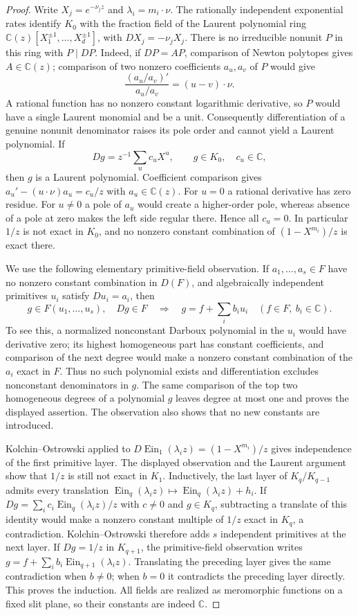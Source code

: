 \documentclass[11pt]{article}
\theoremstyle{definition}
\theoremstyle{remark}
\newcommand{\Ein}{\operatorname{Ein}}
\begin{document}
\begin{proof}
Write $X_j=e^{-\nu_jz}$ and $\lambda_i=m_i\cdot\nu$.
The rationally independent exponential rates identify $K_0$ with the
fraction field of the Laurent polynomial ring
$\mathbb C(z)[X_1^{\pm1},\ldots,X_d^{\pm1}]$,
with $DX_j=-\nu_jX_j$.
There is no irreducible nonunit $P$ in this ring with $P\mid DP$.
Indeed, if $DP=AP$, comparison of Newton polytopes gives
$A\in\mathbb C(z)$; comparison of two nonzero coefficients $a_u,a_v$
of $P$ would give
\[
 \frac{(a_u/a_v)'}{a_u/a_v}=(u-v)\cdot\nu.
\]
A rational function has no nonzero constant logarithmic derivative,
so $P$ would have a single Laurent monomial and be a unit.
Consequently differentiation of a genuine nonunit denominator raises
its pole order and cannot yield a Laurent polynomial. If
\[
 Dg=z^{-1}\sum_u c_uX^u,\qquad g\in K_0,\quad c_u\in\mathbb C,
\]
then $g$ is a Laurent polynomial. Coefficient comparison gives
$a_u'-(u\cdot\nu)a_u=c_u/z$ with $a_u\in\mathbb C(z)$.
For $u=0$ a rational derivative has zero residue. For $u\ne0$ a
pole of $a_u$ would create a higher-order pole, whereas absence of a
pole at zero makes the left side regular there. Hence all $c_u=0$.
In particular $1/z$ is not exact in $K_0$, and no nonzero constant
combination of $(1-X^{m_i})/z$ is exact there.

We use the following elementary primitive-field observation. If
$a_1,\ldots,a_s\in F$ have no nonzero constant combination in $D(F)$,
and algebraically independent primitives $u_i$ satisfy $Du_i=a_i$,
then
\[
 g\in F(u_1,\ldots,u_s),\quad Dg\in F
 \quad\Longrightarrow\quad
 g=f+\sum_i b_i u_i\quad(f\in F,\ b_i\in\mathbb C).
\]
To see this, a normalized nonconstant Darboux polynomial in the $u_i$
would have derivative zero; its highest homogeneous part has constant
coefficients, and comparison of the next degree would make a nonzero
constant combination of the $a_i$ exact in $F$. Thus no such polynomial
exists and differentiation excludes nonconstant denominators in $g$.
The same comparison of the top two homogeneous degrees of a polynomial
$g$ leaves degree at most one and proves the displayed assertion.
The observation also shows that no new constants are introduced.

Kolchin--Ostrowski applied to
$D\Ein_1(\lambda_i z)=(1-X^{m_i})/z$ gives independence of the first
primitive layer. The displayed observation and the Laurent argument
show that $1/z$ is still not exact in $K_1$.
Inductively, the last layer of $K_q/K_{q-1}$ admits every translation
$\Ein_q(\lambda_i z)\mapsto \Ein_q(\lambda_i z)+h_i$.
If $Dg=\sum_i c_i\Ein_q(\lambda_i z)/z$ with $c\ne0$ and $g\in K_q$,
subtracting a translate of this identity would make a nonzero
constant multiple of $1/z$ exact in $K_q$, a contradiction.
Kolchin--Ostrowski therefore adds $s$ independent primitives at the
next layer. If $Dg=1/z$ in $K_{q+1}$, the primitive-field observation
writes $g=f+\sum_i b_i\Ein_{q+1}(\lambda_i z)$. Translating the preceding
layer gives the same contradiction when $b\ne0$; when $b=0$ it
contradicts the preceding layer directly. This proves the induction.
All fields are realized as meromorphic functions on a fixed slit
plane, so their constants are indeed $\mathbb C$.


\end{proof}
\end{document}
